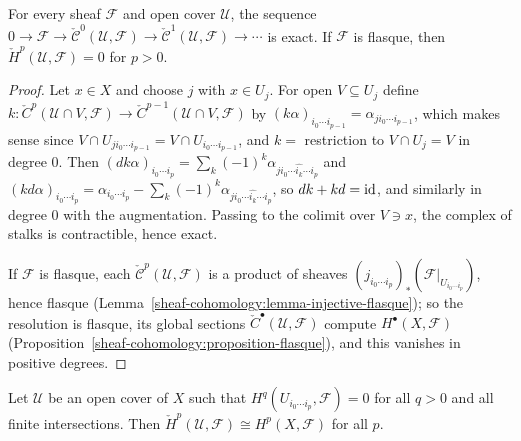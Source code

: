 \begin{lemma}\label{sheaf-cohomology:lemma-cech-resolution}
For every sheaf $\mathcal{F}$ and open cover $\mathcal{U}$, the sequence $0 \to \mathcal{F} \to \check{\mathcal{C}}^0(\mathcal{U}, \mathcal{F}) \to \check{\mathcal{C}}^1(\mathcal{U}, \mathcal{F}) \to \cdots$ is exact.
If $\mathcal{F}$ is flasque, then $\check{H}^p(\mathcal{U}, \mathcal{F}) = 0$ for $p > 0$.
\end{lemma}

\begin{proof}
Let $x \in X$ and choose $j$ with $x \in U_j$. For open $V \subseteq U_j$ define $k \colon \check{C}^p(\mathcal{U} \cap V, \mathcal{F}) \to \check{C}^{p-1}(\mathcal{U} \cap V, \mathcal{F})$ by
$(k\alpha)_{i_0 \cdots i_{p-1}} = \alpha_{ji_0 \cdots i_{p-1}}$, which makes sense since $V \cap U_{ji_0 \cdots i_{p-1}} = V \cap U_{i_0 \cdots i_{p-1}}$, and $k = $ restriction to $V \cap U_j = V$ in
degree $0$. Then
$(dk\alpha)_{i_0 \cdots i_p} = \sum_k(-1)^k\alpha_{ji_0 \cdots \widehat{i_k} \cdots i_p}$ and $(kd\alpha)_{i_0 \cdots i_p} = \alpha_{i_0 \cdots i_p} - \sum_k(-1)^k\alpha_{ji_0 \cdots \widehat{i_k} \cdots i_p}$, so
$dk + kd = \mathrm{id}$, and similarly in degree $0$ with the augmentation. Passing to the colimit over $V \ni x$, the complex of stalks is contractible, hence exact.

If $\mathcal{F}$ is flasque, each $\check{\mathcal{C}}^p(\mathcal{U}, \mathcal{F})$ is a product of sheaves $(j_{i_0 \cdots i_p})_*(\mathcal{F}|_{U_{i_0 \cdots i_p}})$, hence flasque
(Lemma~\ref{sheaf-cohomology:lemma-injective-flasque}); so the resolution is flasque, its global sections $\check{C}^\bullet(\mathcal{U}, \mathcal{F})$ compute $H^\bullet(X, \mathcal{F})$
(Proposition~\ref{sheaf-cohomology:proposition-flasque}), and this vanishes in positive degrees.
\end{proof}

\begin{theorem}[Leray]\label{sheaf-cohomology:theorem-leray}
Let $\mathcal{U}$ be an open cover of $X$ such that $H^q(U_{i_0 \cdots i_p}, \mathcal{F}) = 0$ for all $q > 0$ and all finite intersections. Then
$\check{H}^p(\mathcal{U}, \mathcal{F}) \cong H^p(X, \mathcal{F})$ for all $p$.
\end{theorem}

